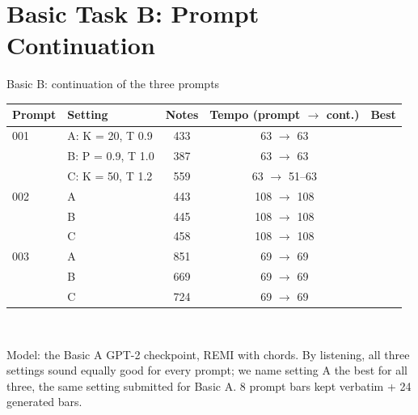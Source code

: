 \documentclass[aspectratio=169,11pt]{beamer}
\newcommand{\best}[1]{\textbf{\alert{#1}}}                       %
\newcommand{\src}[1]{\vfill{\scriptsize\color{gray}#1}}          %
\begin{document}
\section{Basic Task B: Prompt Continuation}
\begin{frame}[t]{Basic B: continuation of the three prompts}
  \centering\small
  \begin{tabular}{@{}llccc@{}}
    \toprule
    Prompt & Setting & Notes & Tempo (prompt $\rightarrow$ cont.) & Best \\
    \midrule
    001 & A: K = 20, T 0.9 & 433 & 63 $\rightarrow$ 63    & \best{\checkmark} \\
        & B: P = 0.9, T 1.0 & 387 & 63 $\rightarrow$ 63   & \\
        & C: K = 50, T 1.2 & 559 & 63 $\rightarrow$ 51--63 & \\
    \midrule
    002 & A & 443 & 108 $\rightarrow$ 108 & \best{\checkmark} \\
        & B & 445 & 108 $\rightarrow$ 108 & \\
        & C & 458 & 108 $\rightarrow$ 108 & \\
    \midrule
    003 & A & 851 & 69 $\rightarrow$ 69 & \best{\checkmark} \\
        & B & 669 & 69 $\rightarrow$ 69 & \\
        & C & 724 & 69 $\rightarrow$ 69 & \\
    \bottomrule
  \end{tabular}\\[0.6em]
  \raggedright
  Model: the Basic A GPT-2 checkpoint, REMI with chords. By listening, all three settings
  sound equally good for every prompt; we name setting A the best for all three, the same
  setting submitted for Basic A.
  \src{8 prompt bars kept verbatim + 24 generated bars.}
\end{frame}

\end{document}
